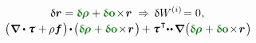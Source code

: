 \nopagebreak\vspace{-0.25em}\begin{equation*}
\begin{array}{c}
\variation{\currentlocationvector} = \constvarvector{\hspace{-0.1ex}\bm{\rho}} \hspace{.1ex} + \constvarvector{o} \hspace{-0.33ex} \times \hspace{-0.33ex} \currentlocationvector
\hspace{.66ex}\Rightarrow\hspace{.4ex}
\variation{\internalwork} \hspace{-0.2ex} = 0
\hspace{.1ex} ,
\\[.2em]
%
\bigl( \hspace{.1ex} \boldnabla \dotp \cauchystress \hspace{.1ex} + \hspace{-0.1ex} \rho \bm{f} \hspace{.16ex} \bigr)
\hspace{-0.25ex} \dotp \hspace{-0.25ex}
\bigl(  \constvarvector{\hspace{-0.1ex}\bm{\rho}} \hspace{.1ex} + \constvarvector{o} \hspace{-0.33ex} \times \hspace{-0.33ex} \currentlocationvector \hspace{.2ex} \bigr) \hspace{-0.16ex}
+ \cauchystress^{\hspace{.16ex}\T} \hspace{-0.5ex}
\dotdotp
\hspace{-0.16ex} \boldnabla \hspace{.1ex} \bigl(
\constvarvector{\hspace{-0.1ex}\bm{\rho}} \hspace{.1ex} +
\constvarvector{o} \hspace{-0.33ex} \times \hspace{-0.33ex} \currentlocationvector \hspace{.2ex} \bigr) \hspace{-0.25ex}

\end{array}
\end{equation*}
